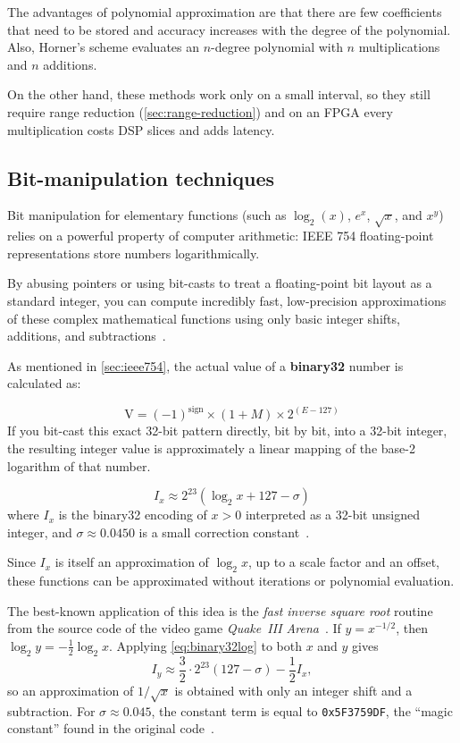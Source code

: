 The advantages of polynomial approximation are that there are few coefficients that need to be stored and accuracy increases with the degree of the polynomial. Also, Horner's scheme evaluates an $n$-degree polynomial with $n$ multiplications and $n$ additions.

On the other hand, these methods work only on a small interval, so they still require range reduction (\cref{sec:range-reduction}) and on an FPGA every multiplication costs DSP slices and adds latency.

\subsection{Bit-manipulation techniques}
Bit manipulation for elementary functions (such as $\log_{2}(x)$, $e^{x}$, $\sqrt{x}$, and $x^{y}$) relies on a powerful property of computer arithmetic: IEEE 754 floating-point representations store numbers logarithmically.

By abusing pointers or using bit-casts to treat a floating-point bit layout as a standard integer, you can compute incredibly fast, low-precision approximations of these complex mathematical functions using only basic integer shifts, additions, and subtractions~\cite{muller2020}.

As mentioned in \cref{sec:ieee754}, the actual value of a \textbf{binary32} number is calculated as:

\begin{equation}
  \text{V} = (-1)^{\text{sign}} \times \left( 1 + M \right) \times 2^{(E-127)}
  \label{eq:binary32v2}
\end{equation}
If you bit-cast this exact 32-bit pattern directly, bit by bit, into a 32-bit integer, the resulting integer value is approximately a linear mapping of the base-2 logarithm of that number.

\begin{equation}
  I_{x} \approx 2^{23} \left( \log_{2} x + 127 - \sigma \right)
  \label{eq:binary32log}
\end{equation}
where $I_{x}$ is the binary32 encoding of $x > 0$ interpreted as a 32-bit unsigned integer, and $\sigma \approx 0.0450$ is a small correction constant~\cite{wiki_fastinvsqrt}.

Since $I_{x}$ is itself an approximation of $\log_{2} x$, up to a scale factor and an offset, these functions can be approximated without iterations or polynomial evaluation.

The best-known application of this idea is the \emph{fast inverse square root} routine from the source code of the video game \emph{Quake~III Arena}~\cite{wiki_fastinvsqrt}. If $y = x^{-1/2}$, then $\log_{2} y = -\frac{1}{2}\log_{2} x$. Applying \cref{eq:binary32log} to both $x$ and $y$ gives
\begin{equation}
  I_{y} \approx \frac{3}{2} \cdot 2^{23} \left( 127 - \sigma \right)
  - \frac{1}{2} I_{x},
  \label{eq:fast-invsqrt}
\end{equation}
so an approximation of $1/\sqrt{x}$ is obtained with only an integer shift and a subtraction. For $\sigma \approx 0.045$, the constant term is equal to \texttt{0x5F3759DF}, the ``magic constant'' found in the original code~\cite{muller2020,wiki_fastinvsqrt}.


